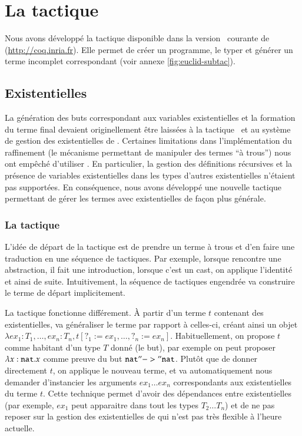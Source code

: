 \newpage
\section{La tactique \Subtac}
Nous avons d\'evelopp\'e la tactique \Subtac{} disponible dans la version
\CVS{}~courante de \Coq{} (\url{http://coq.inria.fr}). Elle permet de
cr\'eer un programme, le typer et g\'en\'erer un terme incomplet
correspondant (voir annexe \ref{fig:euclid-subtac}). 

\subsection{Existentielles}
La g\'en\'eration des buts correspondant aux variables existentielles et la
formation du terme final devaient originellement \^etre laiss\'ees \`a la
tactique \Refine~et au syst\`eme de gestion des existentielles de \Coq. Certaines limitations 
dans l'impl\'ementation du raffinement (le m\'ecanisme permettant de manipuler
des termes ``\`a trous'') nous ont emp\^ech\'e d'utiliser \Refine. En
particulier, la gestion des d\'efinitions r\'ecursives et la pr\'esence de
variables existentielles dans les types d'autres existentielles
 n'\'etaient pas support\'ees. En
cons\'equence, nous avons d\'evelopp\'e une nouvelle tactique \Coq{}
permettant de g\'erer les termes avec existentielles de fa\c con plus
g\'en\'erale. 

\subsubsection{La tactique \eterm}
L'id\'ee de d\'epart de la tactique \Refine{} est de prendre un terme \`a
trous et d'en faire une traduction en une s\'equence de tactiques. Par
exemple, lorsque \Refine{} rencontre une abstraction, il fait une
introduction, lorsque c'est un cast, on applique l'identit\'e et ainsi de
suite. Intuitivement, la s\'equence de tactiques engendr\'ee va construire
le terme de d\'epart implicitement. 

La tactique \eterm{} fonctionne diff\'erement. \`A partir d'un terme $t$ contenant des existentielles, \eterm{} va g\'en\'eraliser le terme par
rapport \`a celles-ci, cr\'eant ainsi un objet $\lambda ex_1 : T_1, \ldots, ex_n :
T_n, t[?_1 := ex_1, \ldots, ?_n := ex_n]$. 
Habituellement, on propose $t$ comme habitant d'un type $T$ donn\'e (le
but), par exemple on peut proposer $\lambda x : \mathtt{nat}.x$ comme preuve du
but $\mathtt{nat} "->" \mathtt{nat}$.
Plut\^ot que de donner directement $t$, on applique le nouveau
terme, et \Coq{} va automatiquement nous demander d'instancier les
arguments $ex_1 \ldots ex_n$ correspondants aux existentielles du terme 
$t$. Cette technique permet d'avoir des d\'ependances entre existentielles
(par exemple, $ex_1$ peut apparaitre dans tout les types $T_2 \ldots
T_n$) et de ne pas reposer sur la gestion des existentielles de \Coq{}
qui n'est pas tr\`es flexible \`a l'heure actuelle.

